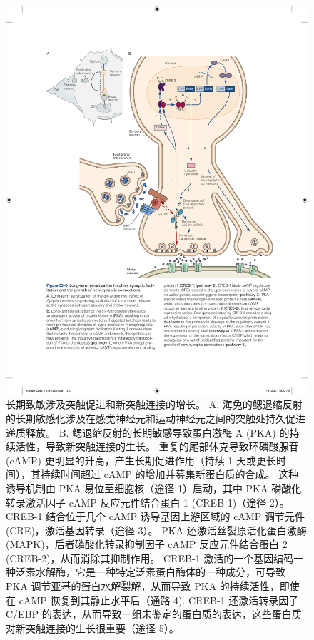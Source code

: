 \begin{figure}[htbp]
	\centering
	\includegraphics[width=0.9\linewidth]{chap53/fig_53_6}
	\caption{长期致敏涉及突触促进和新突触连接的增长。 A. 海兔的鳃退缩反射的长期敏感化涉及在感觉神经元和运动神经元之间的突触处持久促进递质释放。 B. 鳃退缩反射的长期敏感导致蛋白激酶 A (PKA) 的持续活性，导致新突触连接的生长。 重复的尾部休克导致环磷酸腺苷 (cAMP) 更明显的升高，产生长期促进作用（持续 1 天或更长时间），其持续时间超过 cAMP 的增加并募集新蛋白质的合成。 这种诱导机制由 PKA 易位至细胞核（途径 1）启动，其中 PKA 磷酸化转录激活因子 cAMP 反应元件结合蛋白 1 (CREB-1)（途径 2）。 CREB-1 结合位于几个 cAMP 诱导基因上游区域的 cAMP 调节元件 (CRE)，激活基因转录（途径 3）。 PKA 还激活丝裂原活化蛋白激酶 (MAPK)，后者磷酸化转录抑制因子 cAMP 反应元件结合蛋白 2 (CREB-2)，从而消除其抑制作用。 CREB-1 激活的一个基因编码一种泛素水解酶，它是一种特定泛素蛋白酶体的一种成分，可导致 PKA 调节亚基的蛋白水解裂解，从而导致 PKA 的持续活性，即使在 cAMP 恢复到其静止水平后（通路 4). CREB-1 还激活转录因子 C/EBP 的表达，从而导致一组未鉴定的蛋白质的表达，这些蛋白质对新突触连接的生长很重要（途径 5）。}
	\label{fig:53_6}
\end{figure}


